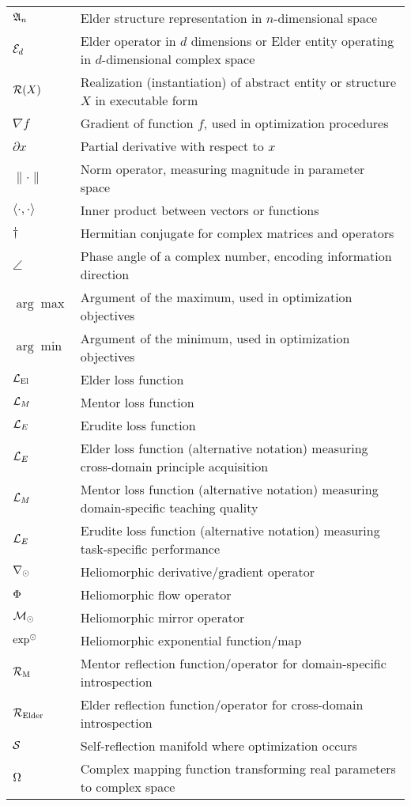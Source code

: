 \begin{tabular}{p{3cm} p{12cm}}
$\mathfrak{A}_{n}$ & Elder structure representation in $n$-dimensional space \\
$\mathcal{E}_{d}$ & Elder operator in $d$ dimensions or Elder entity operating in $d$-dimensional complex space \\
$\mathcal{R}(X)$ & Realization (instantiation) of abstract entity or structure $X$ in executable form \\
$\nabla f$ & Gradient of function $f$, used in optimization procedures \\
$\partial x$ & Partial derivative with respect to $x$ \\
$\| \cdot \|$ & Norm operator, measuring magnitude in parameter space \\
$\langle \cdot, \cdot \rangle$ & Inner product between vectors or functions \\
$\dagger$ & Hermitian conjugate for complex matrices and operators \\
$\angle$ & Phase angle of a complex number, encoding information direction \\
$\arg\max$ & Argument of the maximum, used in optimization objectives \\
$\arg\min$ & Argument of the minimum, used in optimization objectives \\
$\mathcal{L}_{\text{El}}$ & Elder loss function \\
$\mathcal{L}_M$ & Mentor loss function \\
$\mathcal{L}_E$ & Erudite loss function \\
$\mathcal{L}_E$ & Elder loss function (alternative notation) measuring cross-domain principle acquisition \\
$\mathcal{L}_M$ & Mentor loss function (alternative notation) measuring domain-specific teaching quality \\
$\mathcal{L}_E$ & Erudite loss function (alternative notation) measuring task-specific performance \\
$\nabla_{\odot}$ & Heliomorphic derivative/gradient operator \\
$\Phi$ & Heliomorphic flow operator \\
$\mathcal{M}_{\odot}$ & Heliomorphic mirror operator \\
$\exp^{\odot}$ & Heliomorphic exponential function/map \\
$\mathcal{R}_{\text{M}}$ & Mentor reflection function/operator for domain-specific introspection \\
$\mathcal{R}_{\text{Elder}}$ & Elder reflection function/operator for cross-domain introspection \\
$\mathcal{S}$ & Self-reflection manifold where optimization occurs \\
$\Omega$ & Complex mapping function transforming real parameters to complex space \\
\end{tabular}

